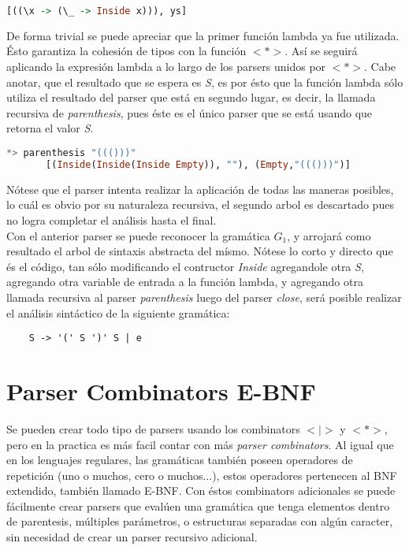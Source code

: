 \begin{exmp}
	\begin{lstlisting}[language=Haskell]
	[((\x -> (\_ -> Inside x))), ys]
	\end{lstlisting}
	
	De forma trivial se puede apreciar que la primer función lambda ya fue utilizada. Ésto garantiza la cohesión de tipos  con la función $<*>$. Así se seguirá aplicando la expresión lambda a lo largo de los parsers unidos por $<*>$. Cabe anotar, que el resultado que se espera es \emph{S}, es por ésto que la función lambda sólo utiliza el resultado del parser que está en segundo lugar, es decir, la llamada recursiva de \emph{parenthesis}, pues éste es el único parser que se está usando que retorna el valor \emph{S}.
	
	\begin{lstlisting}[language=Haskell, caption=Ejemplo de la utilización del parser en GHCi]
	*> parenthesis "((()))"
	   [(Inside(Inside(Inside Empty)), ""), (Empty,"((()))")]
	\end{lstlisting}
	
	Nótese que el parser intenta realizar la aplicación de todas las maneras posibles, lo cuál es obvio por su naturaleza recursiva, el segundo arbol es descartado pues no logra completar el análisis hasta el final.\\
	
	Con el anterior parser se puede reconocer la gramática $G_1$, y arrojará como resultado el arbol de sintaxis abstracta del mísmo. Nótese lo corto y directo que és el código, tan sólo modificando el contructor \emph{Inside} agregandole otra \emph{S}, agregando otra variable de entrada a la función lambda, y agregando otra llamada recursiva al parser \emph{parenthesis} luego del parser \emph{close}, será posible realizar el análisis sintáctico de la siguiente gramática:
	
	\begin{lstlisting}
	S -> '(' S ')' S | e
	\end{lstlisting}
	
\end{exmp}

\section{Parser Combinators E-BNF}
Se pueden crear todo tipo de parsers usando los combinators $<|>$ y $<*>$, pero en la practica es más facil contar con más \emph{parser combinators}. Al igual que en los lenguajes regulares, las gramáticas también poseen operadores de repetición (uno o muchos, cero o muchos...), estos operadores pertenecen al BNF extendido, también llamado E-BNF. Con éstos combinators adicionales se puede fácilmente crear parsers que evalúen una gramática que tenga elementos dentro de parentesis, múltiples parámetros, o estructuras separadas con algún caracter, sin necesidad de crear un parser recursivo adicional.

